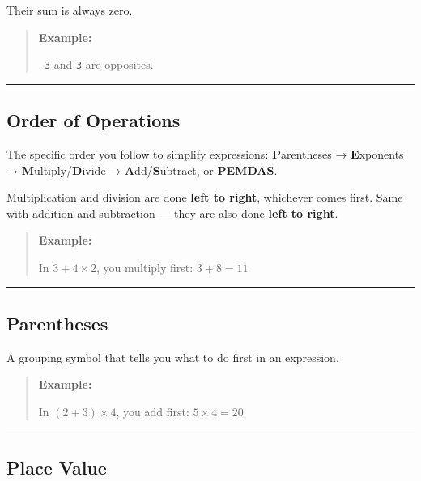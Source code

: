 \documentclass[
  letterpaper,
  DIV=11,
  numbers=noendperiod]{scrreprt}
\begin{document}
Their sum is always zero.

\begin{quote}
\textbf{Example:}

\texttt{-3} and \texttt{3} are opposites.
\end{quote}

\begin{center}\rule{0.5\linewidth}{0.5pt}\end{center}

\subsection*{Order of Operations}\label{glossary-order-of-operations}

The specific order you follow to simplify expressions:
\textbf{P}arentheses → \textbf{E}xponents →
\textbf{M}ultiply/\textbf{D}ivide → \textbf{A}dd/\textbf{S}ubtract, or
\textbf{PEMDAS}.

Multiplication and division are done \textbf{left to right}, whichever
comes first. Same with addition and subtraction --- they are also done
\textbf{left to right}.

\begin{quote}
\textbf{Example:}

In \(3 + 4 \times 2\), you multiply first: \(3 + 8 = 11\)
\end{quote}

\begin{center}\rule{0.5\linewidth}{0.5pt}\end{center}

\subsection*{Parentheses}\label{glossary-parentheses}

A grouping symbol that tells you what to do first in an expression.

\begin{quote}
\textbf{Example:}

In \((2 + 3) \times 4\), you add first: \(5 \times 4 = 20\)
\end{quote}

\begin{center}\rule{0.5\linewidth}{0.5pt}\end{center}

\subsection*{Place Value}\label{glossary-place-value}
\end{document}

